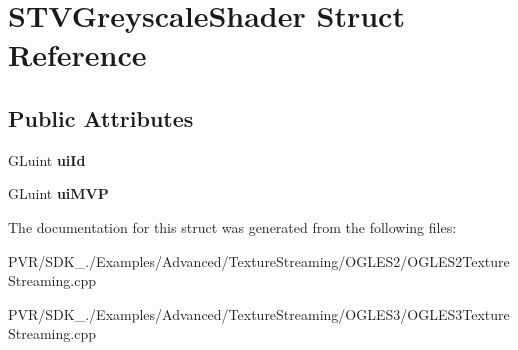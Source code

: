 \hypertarget{struct_s_t_v_greyscale_shader}{\section{S\+T\+V\+Greyscale\+Shader Struct Reference}
\label{struct_s_t_v_greyscale_shader}
}
\subsection*{Public Attributes}
\begin{DoxyCompactItemize}
\item 
\hypertarget{struct_s_t_v_greyscale_shader_abfe205664a67a4dc91e75b5a129a1abd}{G\+Luint {\bfseries ui\+Id}}\label{struct_s_t_v_greyscale_shader_abfe205664a67a4dc91e75b5a129a1abd}

\item 
\hypertarget{struct_s_t_v_greyscale_shader_aa195e430c4b133aaf788ccd8b21f8ecb}{G\+Luint {\bfseries ui\+M\+V\+P}}\label{struct_s_t_v_greyscale_shader_aa195e430c4b133aaf788ccd8b21f8ecb}

\end{DoxyCompactItemize}


The documentation for this struct was generated from the following files\+:\begin{DoxyCompactItemize}
\item 
P\+V\+R/\+S\+D\+K\+\_./\+Examples/\+Advanced/\+Texture\+Streaming/\+O\+G\+L\+E\+S2/O\+G\+L\+E\+S2\+Texture\+Streaming.\+cpp\item 
P\+V\+R/\+S\+D\+K\+\_./\+Examples/\+Advanced/\+Texture\+Streaming/\+O\+G\+L\+E\+S3/O\+G\+L\+E\+S3\+Texture\+Streaming.\+cpp\end{DoxyCompactItemize}
